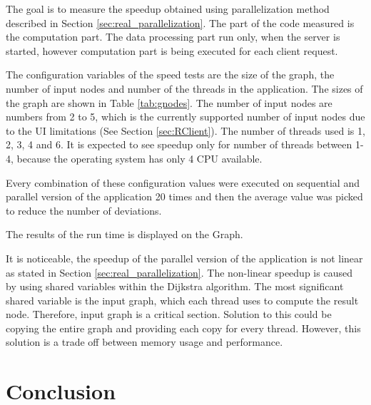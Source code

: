 \documentclass[thesis=M,english]{FITthesis}[2012/10/20]
\begin{document}
The goal is to measure the speedup obtained using parallelization method described in Section \ref{sec:real_parallelization}.
The part of the code measured is the computation part. The data processing part run only, when the server is started, however computation part is being executed for each client request.

The configuration variables of the speed tests are the size of the graph, the number of input nodes and number of the threads in the application. The sizes of the graph are shown in Table \ref{tab:gnodes}. The number of input nodes are numbers from 2 to 5, which is the currently supported number of input nodes due to the UI limitations (See Section \ref{sec:RClient}). The number of threads used is 1, 2, 3, 4 and 6. It is expected to see speedup only for number of threads between 1-4, because the operating system has only 4 CPU available. 

Every combination of these configuration values were executed on sequential and parallel version of the application 20 times and then the average value was picked to reduce the number of deviations.

The results of the run time is displayed on the Graph.


It is noticeable, the speedup of the parallel version of the application is not linear as stated in Section \ref{sec:real_parallelization}. The non-linear speedup is caused by using shared variables within the Dijkstra algorithm. The most significant shared variable is the input graph, which each thread uses to compute the result node. Therefore, input graph is a critical section.
Solution to this could be copying the entire graph and providing each copy for every thread. However, this solution is a trade off between memory usage and performance.



\chapter{Conclusion}
\end{document}
